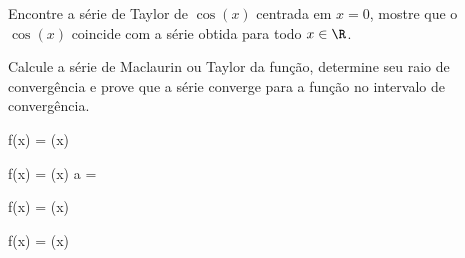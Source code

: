 \begin{exercises}

\begin{exercise}
  Encontre a série de Taylor de $\cos(x)$ centrada em $x=0$,
  mostre que o $\cos(x)$ coincide com a série obtida para todo $x\in\R$.
\end{exercise}

\begin{exercise}
	Calcule a série de Maclaurin ou Taylor da função, determine seu raio de convergência
	e prove que a série converge para a função no intervalo de convergência.
	\begin{mathlist}
		\item f(x) = \sin(\pi x)
		\item f(x) = \sin(x) \qquad a = 
		\item f(x) = \sinh(x)
		\item f(x) = \cosh(x)
	\end{mathlist}
\end{exercise}



\end{exercises}
